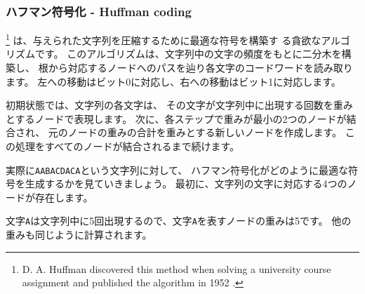 
\subsubsection{ハフマン符号化 - Huffman coding}

\footnote{D. A. Huffman discovered this method
when solving a university course assignment
and published the algorithm in 1952 \cite{huf52}.}
は、与えられた文字列を圧縮するために最適な符号を構築す る貪欲なアルゴリズムです。
このアルゴリズムは、文字列中の文字の頻度をもとに二分木を構築し、
根から対応するノードへのパスを辿り各文字のコードワードを読み取ります。
左への移動はビット0に対応し、右への移動はビット1に対応します。

初期状態では、文字列の各文字は、
その文字が文字列中に出現する回数を重みとするノードで表現します。
次に、各ステップで重みが最小の2つのノードが結合され、
元のノードの重みの合計を重みとする新しいノードを作成します。
この処理をすべてのノードが結合されるまで続けます。

実際に\texttt{AABACDACA}という文字列に対して、
ハフマン符号化がどのように最適な符号を生成するかを見ていきましょう。
最初に、文字列の文字に対応する4つのノードが存在します。
\begin{center}
\end{center}

文字\texttt{A}は文字列中に5回出現するので、文字\texttt{A}を表すノードの重みは5です。
他の重みも同じように計算されます。

